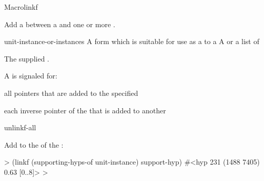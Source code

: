 \documentclass[10pt,twoside,english,pdftex]{article}
\begin{document}
\begin{functiondoc}{Macro}{linkf}%
 {
   \returns{} } 
%
%

\fnsyntax

\fnpurpose Add a  between a  and one
or more .

\fnpackage {}

\fnmodule {}

\fnargs
\begin{args}{unit-instance-or-instances}
 A form which is suitable for use as a
 to a 
 A  or a
list of 
\end{args}

\fnreturns The supplied .

\fnevents
{}%
%
%
%
%
%
A  is signaled for:
\begin{tightitemize}
\item all pointers that are added to the specified
\item  each inverse pointer of the  that is added to
  another 
\end{tightitemize}

\begin{alsos}{unlinkf-all}
\also[unlinkf]
\end{alsos}

\fnexample Add  to the 
 of the  
:
%
\W\supp
\begin{example}
  > (linkf (supporting-hyps-of unit-instance) support-hyp)
  #<hyp 231 (1488 7405) 0.63 [0..8]>
  >
\end{example}

\end{functiondoc}

\end{document}
